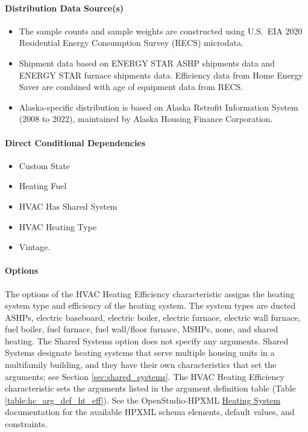 \paragraph{Distribution Data Source(s)}
\begin{itemize}
    \item The sample counts and sample weights are constructed using U.S.~EIA 2020 Residential Energy Consumption Survey (RECS) microdata. 
    \item Shipment data based on ENERGY STAR ASHP shipments data and ENERGY STAR furnace shipments data. Efficiency data from Home Energy Saver are combined with age of equipment data from RECS. 
    \item Alaska-specific distribution is based on Alaska Retrofit Information System (2008 to 2022), maintained by Alaska Housing Finance Corporation.
\end{itemize}

\paragraph{Direct Conditional Dependencies}
\begin{itemize}
    \item Custom State
    \item Heating Fuel
    \item HVAC Has Shared System
    \item HVAC Heating Type
    \item Vintage.
\end{itemize}

\paragraph{Options}
The options of the HVAC Heating Efficiency characteristic assigns the heating system type and efficiency of the heating system. The system types are ducted ASHPs, electric baseboard, electric boiler, electric furnace, electric wall furnace, fuel boiler, fuel furnace, fuel wall/floor furnace, MSHPs, none, and shared heating. The Shared Systems option does not specify any arguments. Shared Systems designate heating systems that serve multiple housing units in a multifamily building, and they have their own characteristics that set the arguments; see Section \ref{sec:shared_systems}. The HVAC Heating Efficiency characteristic sets the arguments listed in the argument definition table (Table \ref{table:hc_arg_def_ht_eff}). See the OpenStudio-HPXML \href{https://openstudio-hpxml.readthedocs.io/en/v1.8.1/workflow_inputs.html#hpxml-heating-systems}{Heating System} documentation for the available HPXML schema elements, default values, and constraints.

